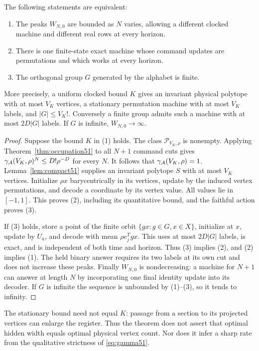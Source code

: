 \begin{theorem}
\label{thm:finitegroup51}
The following statements are equivalent:
\begin{enumerate}
\item The peaks $W_{N,0}$ are bounded as $N$ varies, allowing a different
clocked machine and different real rows at every horizon.
\item There is one finite-state exact machine whose command updates
are permutations and which works at every horizon.
\item The orthogonal group $G$ generated by the alphabet is finite.
\end{enumerate}
More precisely, a uniform clocked bound $K$ gives an invariant physical
polytope with at most $V_K$ vertices, a stationary permutation machine
with at most $V_K$ labels, and $|G|\le V_K!$. Conversely a finite
group admits such a machine with at most $2D|G|$ labels. If $G$ is
infinite, $W_{N,0}\to\infty$.
\end{theorem}
\begin{proof}
Suppose the bound $K$ in (1) holds. The class
$\mathscr P_{V_K,\rho}$ is nonempty. Applying
Theorem~\ref{thm:occupation51} to all $N+1$ command cuts gives
$\gamma_{\mathcal A}(V_K,\rho)^N\le D!\rho^{-D}$ for every $N$.
It follows that $\gamma_{\mathcal A}(V_K,\rho)=1$.
Lemma~\ref{lem:compact51} supplies an invariant polytope $S$ with at
most $V_K$ vertices. Initialize $\rho x$ barycentrically in its
vertices, update by the induced vertex permutations, and decode a
coordinate by its vertex value. All values lie in $[-1,1]$.
This proves (2), including its quantitative bound, and the faithful
action proves (3).

If (3) holds, store a point of the finite orbit
$\{gx:g\in G,x\in X\}$, initialize at $x$, update by $U_a$, and
decode with mean $\rho e_j^Tgx$. This uses at most $2D|G|$ labels,
is exact, and is independent of both time and horizon. Thus (3)
implies (2), and (2) implies (1). The held binary answer requires its
two labels at its own cut and does not increase these peaks.
Finally $W_{N,0}$ is nondecreasing: a machine for $N+1$ can answer
at length $N$ by incorporating one final identity update into its
decoder. If $G$ is infinite the sequence is unbounded by (1)--(3),
so it tends to infinity.
\end{proof}

The stationary bound need not equal $K$: passage from a section to
its projected vertices can enlarge the register. Thus the theorem
does not assert that optimal hidden width equals optimal physical
vertex count. Nor does it infer a sharp rate from the qualitative
strictness of \eqref{eq:gamma51}.

